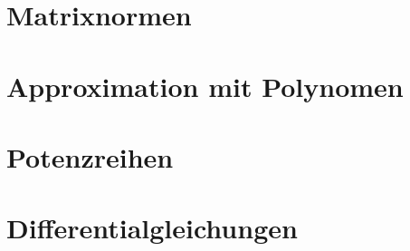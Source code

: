 %
%
%

\section{Matrixnormen}

\section{Approximation mit Polynomen}

\section{Potenzreihen}

\section{Differentialgleichungen}


